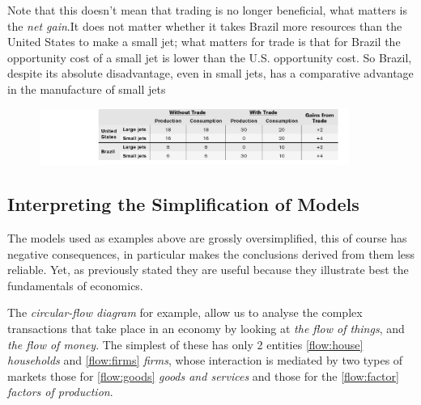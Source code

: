 \documentclass[english,course]{Notes}
\newcommand{\ita}[1]{\textit{#1}}
\begin{document}
\par{Note that this doesn't mean that trading is no longer beneficial, what matters is the \ita{net gain}.It
does not matter whether it takes Brazil more resources than the United States to make a small jet; what matters for trade is that for Brazil the opportunity cost of a small jet is lower than the U.S. opportunity cost. So Brazil, despite its absolute
disadvantage, even in small jets, has a comparative advantage in the manufacture of small jets}

\begin{figure}[ht]
\centering
\includegraphics[width=0.9\textwidth]{jetsTrade2}
\end{figure}

\subsection{Interpreting the Simplification of Models}
\par{The models used as examples above are grossly oversimplified, this of course has negative consequences, in particular makes the conclusions derived from them less reliable. Yet, as previously stated they are useful because they  illustrate best the fundamentals of economics.}

\par{The \ita{circular-flow diagram} for example, allow us to analyse the complex transactions that take place in an economy by looking at \ita{the flow of things}, and \ita{the flow of money}. The simplest of these has only 2 entities  \ref{flow:house} \ita{households} and \ref{flow:firms} \ita{firms}, whose interaction is mediated by two types of markets those for \ref{flow:goods} \ita{goods and services} and those for the \ref{flow:factor} \ita{factors of production}.}

\newpage
\end{document}
